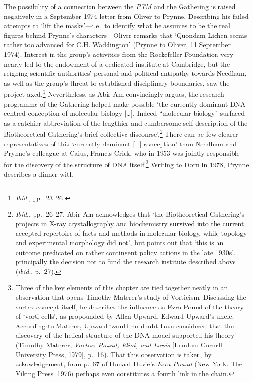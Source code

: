 \documentclass[]{article}
\begin{document}
The possibility of a connection between the \emph{PTM} and the Gathering
is raised negatively in a September 1974 letter from Oliver to Prynne.
Describing his failed attempts to `lift the masks'---i.e.~to identify
what he assumes to be the real figures behind Prynne's
characters---Oliver remarks that `Quondam Lichen seems rather too
advanced for C.H. Waddington' (Prynne to Oliver, 11 September 1974).
Interest in the group's activities from the Rockefeller Foundation very
nearly led to the endowment of a dedicated institute at Cambridge, but
the reigning scientific authorities' personal and political antipathy
towards Needham, as well as the group's threat to established
disciplinary boundaries, saw the project axed.\footnote{\emph{Ibid}.,
  pp.~23--26.} Nevertheless, as Abir-Am convincingly argues, the
research programme of the Gathering helped make possible `the currently
dominant DNA-centred conception of molecular biology {[}\ldots{}{]}.
Indeed ``molecular biology'' surfaced as a catchier abbreviation of the
lengthier and cumbersome self-description of the Biotheoretical
Gathering's brief collective discourse'.\footnote{\emph{Ibid}.,
  pp.~26--27. Abir-Am acknowledges that `the Biotheoretical Gathering's
  projects in X-ray crystallography and biochemistry survived into the
  current accepted repertoire of facts and methods in molecular biology,
  while topology and experimental morphology did not', but points out
  that `this is an outcome predicated on rather contingent policy
  actions in the late 1930s', principally the decision not to fund the
  research institute described above (\emph{ibid}., p.~27).} There can
be few clearer representatives of this `currently dominant
{[}\ldots{}{]} conception' than Needham and Prynne's colleague at Caius,
Francis Crick, who in 1953 was jointly responsible for the discovery of
the structure of DNA itself.\footnote{Three of the key elements of this
  chapter are tied together neatly in an observation that opens Timothy
  Materer's study of Vorticism. Discussing the vortex concept itself, he
  describes the influence on Ezra Pound of the theory of `vorti-cells',
  as propounded by Allen Upward, Edward Upward's uncle. According to
  Materer, Upward `would no doubt have considered that the discovery of
  the helical structure of the DNA model supported his theory' (Timothy
  Materer, \emph{Vortex: Pound, Eliot, and Lewis} {[}London: Cornell
  University Press, 1979{]}, p.~16). That this observation is taken, by
  ackowledgement, from p.~67 of Donald Davie's \emph{Ezra Pound} (New
  York: The Viking Press, 1976) perhaps even constitutes a fourth link
  in the chain.} Writing to Dorn in 1978, Prynne describes a dinner with
\end{document}
